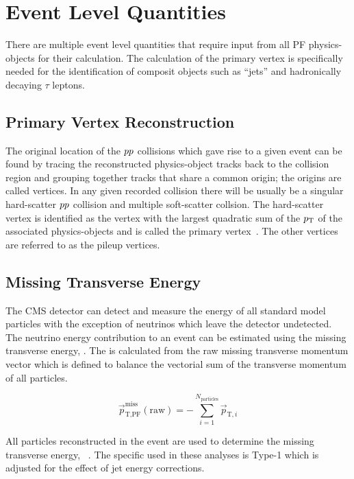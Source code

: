 \section{Event Level Quantities}
There are multiple event level quantities that require input from all PF physics-objects for their
calculation. The calculation of the primary vertex is specifically needed for the identification of
composit objects such as ``jets'' and hadronically decaying $\tau$ leptons.


\subsection{Primary Vertex Reconstruction}
The original location of the $pp$ collisions which gave rise to a given event can be found by tracing
the reconstructed physics-object tracks back to the collision region and grouping together tracks that share a common
origin; the origins are called vertices. In any given recorded collision there will be usually be a 
singular hard-scatter $pp$ collision and multiple soft-scatter collsion. The hard-scatter vertex is 
identified as the vertex with the largest quadratic sum of the $p_\mathrm{T}$ of the associated physics-objects 
and is called the primary vertex~\cite{Sirunyan:2017ulk}. The other vertices are referred to as the
pileup vertices.


\subsection{Missing Transverse Energy}
The CMS detector can detect and measure the energy of all standard model particles with the exception
of neutrinos which leave the detector undetected. The neutrino energy contribution to an event can
be estimated using the missing transverse energy, \etvecmiss. The \etvecmiss is calculated from
the raw missing transverse momentum vector which is defined 
to balance the vectorial sum of the transverse momentum of all particles.

\begin{equation}
\vec{p}^{\text{miss}}_{\text{T,PF}}(\text{raw}) = - \sum^{N_{\text{particles}}}_{i=1} \vec{p}_{\text{T},i}
\end{equation}

All particles reconstructed in the event are used to determine the missing transverse energy,
\etvecmiss~\cite{Khachatryan:2014gga}. The specific \etvecmiss used in these analyses is Type-1
\etvecmiss which is adjusted for the effect of jet energy corrections.



